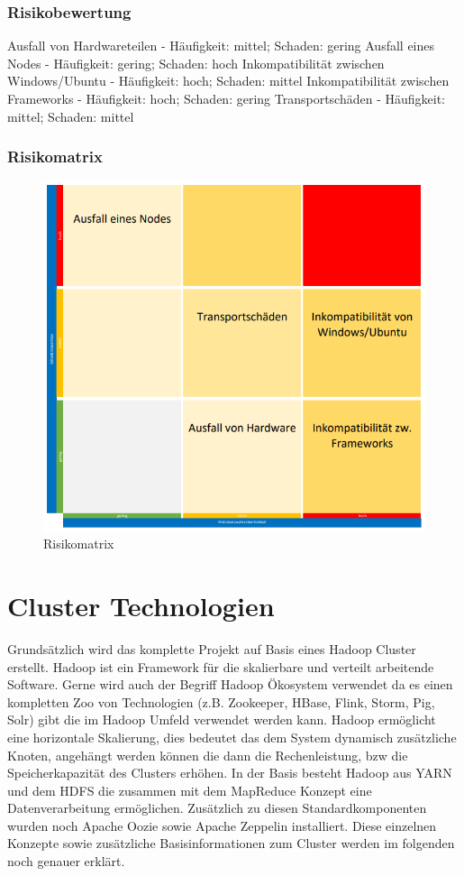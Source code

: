 \documentclass[12pt,oneside,a4paper,parskip]{scrbook}
\begin{document}
\subsection{Risikobewertung}
Ausfall von Hardwareteilen - Häufigkeit: mittel; Schaden: gering
Ausfall eines Nodes - Häufigkeit: gering; Schaden: hoch
Inkompatibilität zwischen Windows/Ubuntu - Häufigkeit: hoch; Schaden: mittel
Inkompatibilität zwischen Frameworks - Häufigkeit: hoch; Schaden: gering
Transportschäden - Häufigkeit: mittel; Schaden: mittel
\subsection{Risikomatrix}
\begin{figure}[h!]
\caption{Risikomatrix}
\label{risikoMatrix}
\centering
\includegraphics[scale=1.0]{pictures/risikoanalyse.png}
\end{figure}


\chapter{Cluster Technologien}
Grunds\"atzlich wird das komplette Projekt auf Basis eines Hadoop Cluster erstellt. Hadoop ist ein Framework f\"ur die skalierbare und verteilt arbeitende Software. Gerne wird auch der Begriff  Hadoop \"Okosystem verwendet da es einen kompletten Zoo von Technologien (z.B. Zookeeper, HBase, Flink, Storm, Pig, Solr) gibt die im Hadoop Umfeld verwendet werden kann. Hadoop erm\"oglicht eine horizontale Skalierung, dies bedeutet das dem System dynamisch zus\"atzliche Knoten, angeh\"angt werden k\"onnen die dann die Rechenleistung, bzw die Speicherkapazit\"at des Clusters erh\"ohen. In der Basis besteht Hadoop aus YARN und dem HDFS die zusammen mit dem MapReduce Konzept eine Datenverarbeitung erm\"oglichen. Zus\"atzlich zu diesen Standardkomponenten wurden noch Apache Oozie sowie Apache Zeppelin installiert. Diese einzelnen Konzepte sowie zus\"atzliche Basisinformationen zum Cluster werden im folgenden noch genauer erkl\"art.
\end{document}
